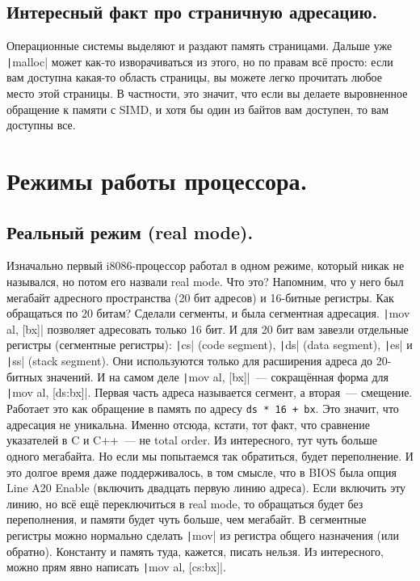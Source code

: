 \documentclass{article}
\begin{document}
    \subsection{Интересный факт про страничную адресацию.}
    Операционные системы выделяют и раздают память страницами. Дальше уже \texttt|malloc| может как-то изворачиваться из этого, но по правам всё просто: если вам доступна какая-то область страницы, вы можете легко прочитать любое место этой страницы. В частности, это значит, что если вы делаете выровненное обращение к памяти с SIMD, и хотя бы один из байтов вам доступен, то вам доступны все.
    \section{Режимы работы процессора.}
    \subsection{Реальный режим (real mode).}
    Изначально первый i8086-процессор работал в одном режиме, который никак не назывался, но потом его назвали real mode. Что это? Напомним, что у него был мегабайт адресного пространства (20 бит адресов) и 16-битные регистры. Как обращаться по 20 битам? Сделали сегменты, и была сегментная адресация. \texttt|mov al, [bx]| позволяет адресовать только 16 бит. И для 20 бит вам завезли отдельные регистры (сегментные регистры): \texttt|cs| (code segment), \texttt|ds| (data segment), \texttt|es| и \texttt|ss| (stack segment). Они используются только для расширения адреса до 20-битных значений. И на самом деле \texttt|mov al, [bx]|~--- сокращённая форма для \texttt|mov al, [ds:bx]|. Первая часть адреса называется сегмент, а вторая~--- смещение. Работает это как обращение в память по адресу \Verb|ds * 16 + bx|. Это значит, что адресация не уникальна. Именно отсюда, кстати, тот факт, что сравнение указателей в C и C++~--- не total order. Из интересного, тут чуть больше одного мегабайта. Но если мы попытаемся так обратиться, будет переполнение. И это долгое время даже поддерживалось, в том смысле, что в BIOS была опция Line A20 Enable (включить двадцать первую линию адреса). Если включить эту линию, но всё ещё переключиться в real mode, то обращаться будет без переполнения, и памяти будет чуть больше, чем мегабайт. В сегментные регистры можно нормально сделать \texttt|mov| из регистра общего назначения (или обратно). Константу и память туда, кажется, писать нельзя. Из интересного, можно прям явно написать \texttt|mov al, [cs:bx]|.\\
\end{document}
